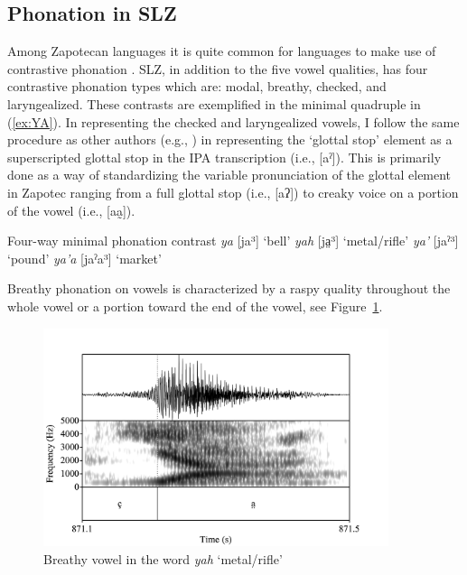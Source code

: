 \documentclass[12pt, letterpaper]{article}
\begin{document}
\subsection{Phonation in SLZ} \label{sec:Phonation}

Among Zapotecan languages it is quite common for languages to make use of contrastive phonation \citep[e.g.,][]{avelinobecerraTopicsYalalagZapotec2004,longDiccionarioZapotecoSan2005,avelinoAcousticElectroglottographicAnalyses2010,lopeznicolasEstudiosFonologiaGramatica2016,chavez-peonInteractionMetricalStructure2010}. 
SLZ, in addition to the five vowel qualities, has four contrastive phonation types which are: modal, breathy, checked, and laryngealized. These contrasts are exemplified in the minimal quadruple in (\ref{ex:YA}). In representing the checked and laryngealized vowels, I follow the same procedure as other authors (e.g., \citet{avelinoAcousticElectroglottographicAnalyses2010, uchiharaToneRegistrogenesisQuiavini2016}) in representing the `glottal stop' element as a superscripted glottal stop in the IPA transcription (i.e., [aˀ]). This is primarily done as a way of standardizing the variable pronunciation of the glottal element in Zapotec ranging from a full glottal stop (i.e., [aʔ]) to creaky voice on a portion of the vowel (i.e., [aa̰]).  

\ea \label{ex:YA} Four-way minimal phonation contrast
	\ea \textit{ya} [ja³]	`bell'
	\ex \textit{yah}  [ja̤³] `metal/rifle'
	\ex \textit{ya'}  [jaˀ³]  `pound'
	\ex \textit{ya'a}  [jaˀa³]  `market'
	\z 
\z 

Breathy phonation on vowels is characterized by a raspy quality throughout the whole vowel or a portion toward the end of the vowel, see Figure~\ref{fig:BreathyVowel}. 

\begin{figure}[!h]
	\centering
	\includegraphics[width=0.9\textwidth]{../yah.png}
	\caption{Breathy vowel in the word \textit{yah} `metal/rifle'}
	\label{fig:BreathyVowel}
\end{figure}
\end{document}
